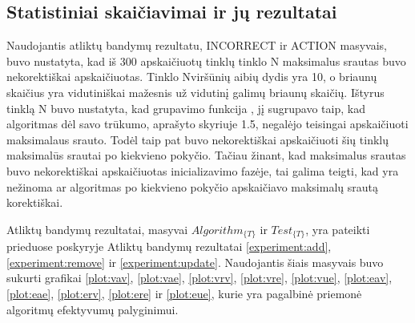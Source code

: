 \subsection{Statistiniai skaičiavimai ir jų rezultatai}

Naudojantis atliktų bandymų rezultatu, INCORRECT ir ACTION masyvais, buvo nustatyta, kad iš 300 apskaičiuotų tinklų tinklo N maksimalus srautas buvo nekorektiškai apskaičiuotas. Tinklo Nviršūnių aibių dydis yra 10, o briaunų skaičius yra vidutiniškai mažesnis už vidutinį galimų briaunų skaičių. Ištyrus tinklą N buvo nustatyta, kad grupavimo funkcija , jį sugrupavo taip, kad algoritmas dėl savo trūkumo, aprašyto skyriuje 1.5, negalėjo teisingai apskaičiuoti maksimalaus srauto. Todėl taip pat buvo nekorektiškai apskaičiuoti šių tinklų maksimalūs srautai po kiekvieno pokyčio. Tačiau žinant, kad maksimalus srautas buvo nekorektiškai apskaičiuotas inicializavimo fazėje, tai galima teigti, kad yra nežinoma ar algoritmas po kiekvieno pokyčio apskaičiavo maksimalų srautą korektiškai.

Atliktų bandymų rezultatai, masyvai $Algorithm_{\{T\}}$ ir $Test_{\{T\}}$, yra pateikti prieduose poskyryje Atliktų bandymų rezultatai \ref{experiment:add}, \ref{experiment:remove} ir \ref{experiment:update}. Naudojantis šiais masyvais buvo sukurti grafikai \ref{plot:vav}, \ref{plot:vae}, \ref{plot:vrv}, \ref{plot:vre}, \ref{plot:vue}, \ref{plot:eav}, \ref{plot:eae}, \ref{plot:erv}, \ref{plot:ere} ir \ref{plot:eue}, kurie yra pagalbinė priemonė algoritmų efektyvumų palyginimui.

